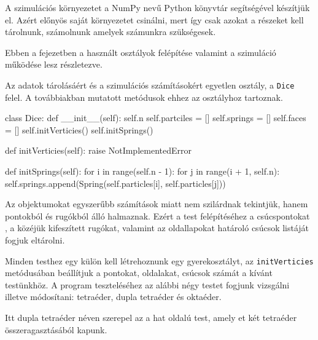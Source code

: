 
A szimulációs környezetet a NumPy \cite{harris2020array} nevű Python \cite{python} könyvtár segítségével készítjük el.
Azért előnyös saját környezetet csinálni, mert így csak azokat a részeket kell tárolnunk, számolnunk amelyek számunkra szükségesek.

Ebben a fejezetben a használt osztályok felépítése valamint a szimuláció működése lesz részletezve.


Az adatok tárolásáért és a szimulációs számításokért egyetlen osztály, a \texttt{Dice} felel.
A továbbiakban mutatott metódusok ehhez az osztályhoz tartoznak.

\begin{python}
class Dice:
    def __init__(self):
        self.n
        self.partciles = []
        self.springs = []
        self.faces = []
        self.initVerticies()
        self.initSprings()

    def initVerticies(self):
        raise NotImplementedError

    def initSprings(self):
        for i in range(self.n - 1):
            for j in range(i + 1, self.n):
                self.springs.append(Spring(self.particles[i],
                                           self.particles[j]))
\end{python}

Az objektumokat egyszerűbb számítások miatt nem szilárdnak tekintjük, hanem pontokból és rugókból álló halmaznak.
Ezért a test felépítéséhez a csúcspontokat , a közéjük kifeszített rugókat, valamint az oldallapokat határoló csúcsok listáját fogjuk eltárolni.

Minden testhez egy külön kell létrehoznunk egy gyerekosztályt, az \texttt{initVerticies} metódusában beállítjuk a pontokat, oldalakat, csúcsok számát a kívánt testünkhöz.
A program teszteléséhez az alábbi négy testet fogjunk vizsgálni illetve módosítani: tetraéder, dupla tetraéder és oktaéder.

\begin{remark}
Itt dupla tetraéder néven szerepel az a hat oldalú test, amely et két tetraéder összeragasztásából kapunk.
\end{remark}

